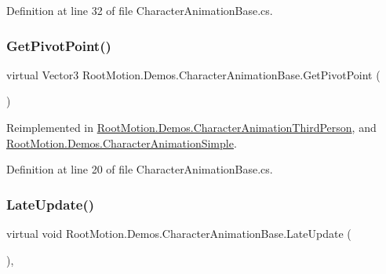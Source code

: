 Definition at line 32 of file Character\+Animation\+Base.\+cs.

\mbox{\label{class_root_motion_1_1_demos_1_1_character_animation_base_a223adef755549b4989920036a2a164cd}} 
\subsubsection{\texorpdfstring{Get\+Pivot\+Point()}{GetPivotPoint()}}
{\footnotesize\ttfamily virtual Vector3 Root\+Motion.\+Demos.\+Character\+Animation\+Base.\+Get\+Pivot\+Point (\begin{DoxyParamCaption}{ }\end{DoxyParamCaption})\hspace{0.3cm}{\ttfamily [virtual]}}



Reimplemented in \mbox{\hyperlink{class_root_motion_1_1_demos_1_1_character_animation_third_person_afb93b73712ca23aafeb4f50f38d68069}{Root\+Motion.\+Demos.\+Character\+Animation\+Third\+Person}}, and \mbox{\hyperlink{class_root_motion_1_1_demos_1_1_character_animation_simple_a29a14a93fd7a5a21c5828536b2d4e721}{Root\+Motion.\+Demos.\+Character\+Animation\+Simple}}.



Definition at line 20 of file Character\+Animation\+Base.\+cs.

\mbox{\label{class_root_motion_1_1_demos_1_1_character_animation_base_ad0609a7de8cae4fb107f91d0439f32d9}} 
\subsubsection{\texorpdfstring{Late\+Update()}{LateUpdate()}}
{\footnotesize\ttfamily virtual void Root\+Motion.\+Demos.\+Character\+Animation\+Base.\+Late\+Update (\begin{DoxyParamCaption}{ }\end{DoxyParamCaption})\hspace{0.3cm}{\ttfamily [protected]}, {\ttfamily [virtual]}}



